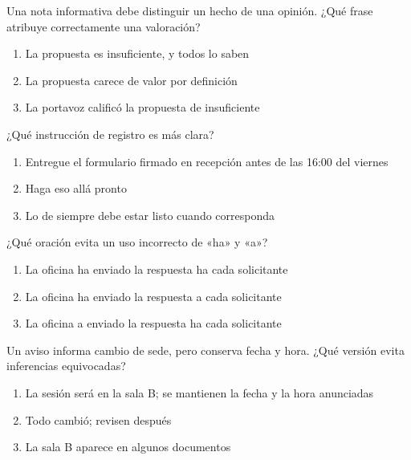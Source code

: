 \noindent\begin{minipage}{\linewidth}\setlength{\parskip}{4pt}\label{q:E-021}
Una nota informativa debe distinguir un hecho de una opinión. ¿Qué frase atribuye correctamente una valoración?
\begin{enumerate}[label=\Alph*),nosep]
\item La propuesta es insuficiente, y todos lo saben
\item La propuesta carece de valor por definición
\item La portavoz calificó la propuesta de insuficiente
\end{enumerate}\end{minipage}\par\medskip

\noindent\begin{minipage}{\linewidth}\setlength{\parskip}{4pt}\label{q:E-022}
¿Qué instrucción de registro es más clara?
\begin{enumerate}[label=\Alph*),nosep]
\item Entregue el formulario firmado en recepción antes de las 16:00 del viernes
\item Haga eso allá pronto
\item Lo de siempre debe estar listo cuando corresponda
\end{enumerate}\end{minipage}\par\medskip

\noindent\begin{minipage}{\linewidth}\setlength{\parskip}{4pt}\label{q:E-023}
¿Qué oración evita un uso incorrecto de «ha» y «a»?
\begin{enumerate}[label=\Alph*),nosep]
\item La oficina ha enviado la respuesta ha cada solicitante
\item La oficina ha enviado la respuesta a cada solicitante
\item La oficina a enviado la respuesta ha cada solicitante
\end{enumerate}\end{minipage}\par\medskip

\noindent\begin{minipage}{\linewidth}\setlength{\parskip}{4pt}\label{q:E-024}
Un aviso informa cambio de sede, pero conserva fecha y hora. ¿Qué versión evita inferencias equivocadas?
\begin{enumerate}[label=\Alph*),nosep]
\item La sesión será en la sala B; se mantienen la fecha y la hora anunciadas
\item Todo cambió; revisen después
\item La sala B aparece en algunos documentos
\end{enumerate}\end{minipage}\par\medskip

